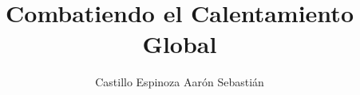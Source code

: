 \documentclass[11pt,twocolumn]{article}
\begin{document}

\title{\Huge \bf Combatiendo el Calentamiento Global}

\author{\large 
Castillo Espinoza Aarón Sebastián}
\maketitle




\end{document}
